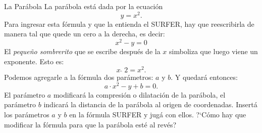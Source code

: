 \begin{surferPage}{La Par{\'a}bola}
La par{\'a}bola est{\'a} dada por la ecuaci{\'o}n  \[y=x^2.\]
Para ingresar esta f{\'o}rmula y que la entienda el SURFER, hay que reescribirla de manera tal que quede un cero a la derecha, es decir:
\[x^2-y=0\]
El {\it peque{\~n}o sombrerito} que se escribe despu{\'e}s de la $x$ simboliza que luego viene un exponente. Esto es: 
\[ x  \,\hat{\ } \, 2 =x^2.\]
Podemos agregarle a la f{\'o}rmula dos par{\'a}metros: $a$ y $b$.\newline
Y quedar{\'a} entonces:
\[a \cdot x^2-y+b=0.\]
El par{\'a}metro $a$ modificar{\'a} la compresi{\'o}n o dilataci{\'o}n de la par{\'a}bola, el par{\'a}metro $b$ indicar{\'a} la distancia de la par{\'a}bola al origen de coordenadas.
\newline
Insert{\'a} los par{\'a}metros $a$ y $b$ en la f{\'o}rmula SURFER y jug{\'a} con ellos. ?`C{\'o}mo hay que  modificar la f{\'o}rmula para que la par{\'a}bola est{\'e} al rev{\'e}s?
\end{surferPage}
